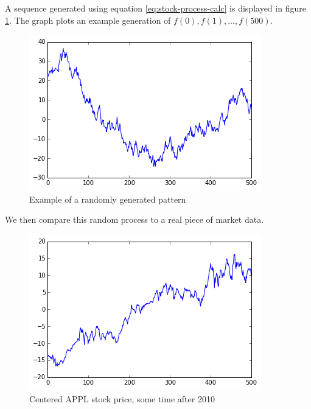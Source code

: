 \documentclass{report}
\begin{document}
A sequence generated using equation \ref{eq:stock-process-calc} is displayed in figure \ref{fig:random-process}. The graph plots an example generation of $f(0), f(1), ..., f(500)$.

\begin{figure}[H]
	\caption{Example of a randomly generated pattern}
	\centerline{\includegraphics[width=\textwidth]{vis/random-process.png}}
	\label{fig:random-process}
\end{figure}

We then compare this random process to a real piece of market data.

\begin{figure}[H]
	\caption{Centered APPL stock price, some time after 2010}
	\centerline{\includegraphics[width=\textwidth]{vis/appl.png}}
	\label{fig:appl-process}
\end{figure}
\end{document}
